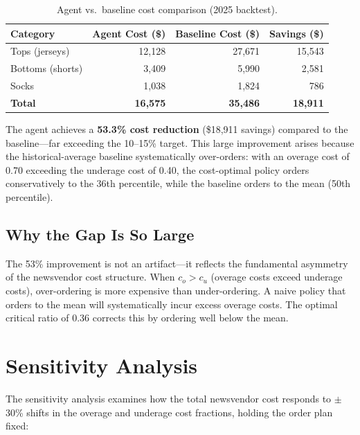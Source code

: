 \documentclass[11pt, letterpaper]{article}
\begin{document}
\begin{table}[H]
\centering
\caption{Agent vs.\ baseline cost comparison (2025 backtest).}
\label{tab:baseline-comparison}
\begin{tabular}{@{}lrrr@{}}
\toprule
\textbf{Category} & \textbf{Agent Cost (\$)} & \textbf{Baseline Cost (\$)} & \textbf{Savings (\$)} \\
\midrule
Tops (jerseys) & 12,128 & 27,671 & 15,543 \\
Bottoms (shorts) & 3,409 & 5,990 & 2,581 \\
Socks & 1,038 & 1,824 & 786 \\
\midrule
\textbf{Total} & \textbf{16,575} & \textbf{35,486} & \textbf{18,911} \\
\bottomrule
\end{tabular}
\end{table}

The agent achieves a \textbf{53.3\% cost reduction} (\$18,911 savings) compared to the baseline---far exceeding the 10--15\% target. This large improvement arises because the historical-average baseline systematically over-orders: with an overage cost of 0.70 exceeding the underage cost of 0.40, the cost-optimal policy orders conservatively to the 36th percentile, while the baseline orders to the mean (50th percentile).

\subsection{Why the Gap Is So Large}

The 53\% improvement is not an artifact---it reflects the fundamental asymmetry of the newsvendor cost structure. When $c_o > c_u$ (overage costs exceed underage costs), over-ordering is more expensive than under-ordering. A naive policy that orders to the mean will systematically incur excess overage costs. The optimal critical ratio of 0.36 corrects this by ordering well below the mean.

\section{Sensitivity Analysis}

The sensitivity analysis examines how the total newsvendor cost responds to $\pm$30\% shifts in the overage and underage cost fractions, holding the order plan fixed:
\end{document}
